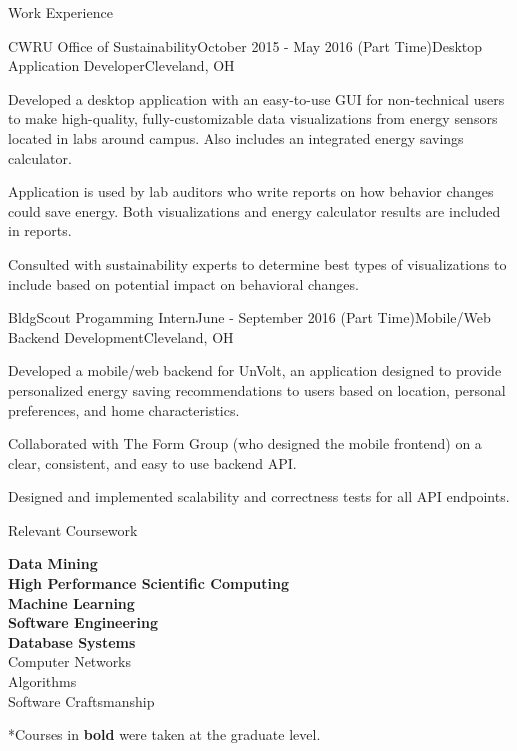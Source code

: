 \documentclass{resume} %
\begin{document}
\begin{rSection}{Work Experience}
\begin{rSubsection}{CWRU Office of Sustainability}{October 2015 - May 2016 (Part Time)}{Desktop Application Developer}{Cleveland, OH}
\item Developed a desktop application with an easy-to-use GUI for non-technical users to make high-quality, fully-customizable data visualizations from energy sensors located in labs around campus. Also includes an integrated energy savings calculator.
\item Application is used by lab auditors who write reports on how behavior changes could save energy. Both visualizations and energy calculator results are included in reports.
\item Consulted with sustainability experts to determine best types of visualizations to include based on potential impact on behavioral changes.
\end{rSubsection}

\begin{rSubsection}{BldgScout Progamming Intern}{June - September 2016 (Part Time)}{Mobile/Web Backend Development}{Cleveland, OH}
\item Developed a mobile/web backend for UnVolt, an application designed to provide personalized energy saving recommendations to users based on location, personal preferences, and home characteristics.
\item Collaborated with The Form Group (who designed the mobile frontend) on a clear, consistent, and easy to use backend API.
\item Designed and implemented scalability and correctness tests for all API endpoints.

\end{rSubsection}

\end{rSection}


\begin{rSection}{Relevant Coursework}
\begin{multicols}{2}[]
\textbf{Data Mining} \\
\textbf{High Performance Scientific Computing} \\
\textbf{Machine Learning} \\
\textbf{Software Engineering} \\ 
\textbf{Database Systems} \\
Computer Networks \\
Algorithms \\
Software Craftsmanship
\end{multicols}
\vspace{-1.0em}
*Courses in \textbf{bold} were taken at the graduate level.
\end{rSection}
\end{document}
